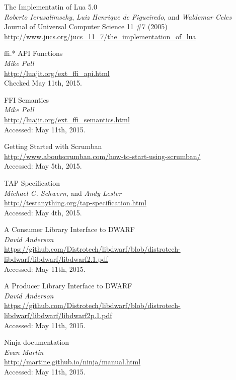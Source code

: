 \begin{thebibliography}{99}
		The Implementatin of Lua 5.0 \\
		\emph{Roberto Ierusalimschy}, \emph{Luiz Henrique de Figueiredo}, and
		\emph{Waldemar Celes} \\
		Journal of Universal Computer Science 11 \#7 (2005) \\
		\url{http://www.jucs.org/jucs_11_7/the_implementation_of_lua}

		ffi.* API Functions \\
		\emph{Mike Pall} \\
		\url{http://luajit.org/ext_ffi_api.html} \\
		Checked May 11th, 2015.

		FFI Semantics \\
		\emph{Mike Pall} \\
		\url{http://luajit.org/ext_ffi_semantics.html} \\
		Accessed: May 11th, 2015.

		Getting Started with Scrumban \\
		\url{http://www.aboutscrumban.com/how-to-start-using-scrumban/} \\
		Accessed: May 5th, 2015.

		TAP Specification \\
		\emph{Michael G. Schwern}, and \emph{Andy Lester} \\
		\url{http://testanything.org/tap-specification.html} \\
		Accessed: May 4th, 2015.

		A Consumer Library Interface to DWARF \\
		\emph{David Anderson} \\
		\url{https://github.com/Distrotech/libdwarf/blob/distrotech-libdwarf/libdwarf/libdwarf2.1.pdf} \\
		Accessed: May 11th, 2015.

		A Producer Library Interface to DWARF \\
		\emph{David Anderson} \\
		\url{https://github.com/Distrotech/libdwarf/blob/distrotech-libdwarf/libdwarf/libdwarf2p.1.pdf} \\
		Accessed: May 11th, 2015.

		Ninja documentation \\
		\emph{Evan Martin} \\
		\url{http://martine.github.io/ninja/manual.html} \\
		Accessed: May 11th, 2015.


\end{thebibliography}
